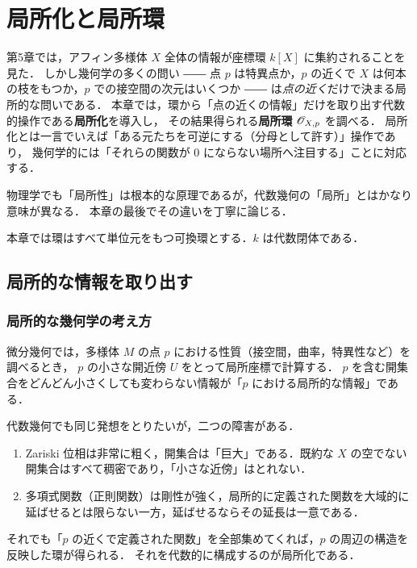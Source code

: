 \chapter{局所化と局所環}
\label{ch:ch06}

\begin{chapterlead}
第5章では，アフィン多様体 $X$ 全体の情報が座標環 $k[X]$ に集約されることを見た．
しかし幾何学の多くの問い ―― 点 $p$ は特異点か，$p$ の近くで $X$ は何本の枝をもつか，$p$ での接空間の次元はいくつか ――
は\emph{点の近く}だけで決まる局所的な問いである．
本章では，環から「点の近くの情報」だけを取り出す代数的操作である\textbf{局所化}を導入し，
その結果得られる\textbf{局所環} $\mathscr{O}_{X,p}$ を調べる．
局所化とは一言でいえば「ある元たちを可逆にする（分母として許す）」操作であり，
幾何学的には「それらの関数が $0$ にならない場所へ注目する」ことに対応する．

物理学でも「局所性」は根本的な原理であるが，代数幾何の「局所」とはかなり意味が異なる．
本章の最後でその違いを丁寧に論じる．
\end{chapterlead}

本章では環はすべて単位元をもつ可換環とする．$k$ は代数閉体である．

\section{局所的な情報を取り出す}

\subsection{局所的な幾何学の考え方}

微分幾何では，多様体 $M$ の点 $p$ における性質（接空間，曲率，特異性など）を調べるとき，
$p$ の小さな開近傍 $U$ をとって局所座標で計算する．
$p$ を含む開集合をどんどん小さくしても変わらない情報が「$p$ における局所的な情報」である．

代数幾何でも同じ発想をとりたいが，二つの障害がある．
\begin{enumerate}
  \item Zariski 位相は非常に粗く，開集合は「巨大」である．既約な $X$ の空でない開集合はすべて稠密であり，「小さな近傍」はとれない．
  \item 多項式関数（正則関数）は剛性が強く，局所的に定義された関数を大域的に延ばせるとは限らない一方，延ばせるならその延長は一意である．
\end{enumerate}
それでも「$p$ の近くで定義された関数」を全部集めてくれば，$p$ の周辺の構造を反映した環が得られる．
それを代数的に構成するのが局所化である．

